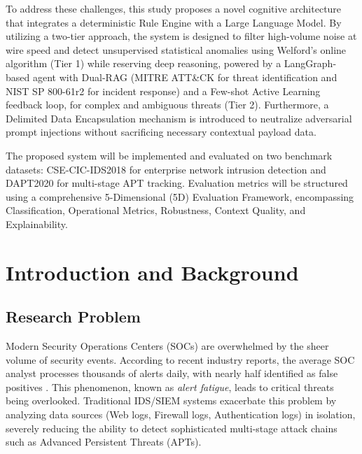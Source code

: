 \documentclass[12pt,a4paper]{article}
\begin{document}
To address these challenges, this study proposes a novel cognitive architecture that integrates a deterministic Rule Engine with a Large Language Model. By utilizing a two-tier approach, the system is designed to filter high-volume noise at wire speed and detect unsupervised statistical anomalies using Welford's online algorithm (Tier 1) while reserving deep reasoning, powered by a LangGraph-based agent with Dual-RAG (MITRE ATT\&CK for threat identification and NIST SP 800-61r2 for incident response) and a Few-shot Active Learning feedback loop, for complex and ambiguous threats (Tier 2). Furthermore, a Delimited Data Encapsulation mechanism is introduced to neutralize adversarial prompt injections without sacrificing necessary contextual payload data.

The proposed system will be implemented and evaluated on two benchmark datasets: CSE-CIC-IDS2018 for enterprise network intrusion detection and DAPT2020 for multi-stage APT tracking. Evaluation metrics will be structured using a comprehensive 5-Dimensional (5D) Evaluation Framework, encompassing Classification, Operational Metrics, Robustness, Context Quality, and Explainability.

\newpage
\tableofcontents

\newpage
\section{Introduction and Background}

\subsection{Research Problem}
Modern Security Operations Centers (SOCs) are overwhelmed by the sheer volume of security events. According to recent industry reports, the average SOC analyst processes thousands of alerts daily, with nearly half identified as false positives \cite{ponemon2023}. This phenomenon, known as \textit{alert fatigue}, leads to critical threats being overlooked. Traditional IDS/SIEM systems exacerbate this problem by analyzing data sources (Web logs, Firewall logs, Authentication logs) in isolation, severely reducing the ability to detect sophisticated multi-stage attack chains such as Advanced Persistent Threats (APTs).
\end{document}
